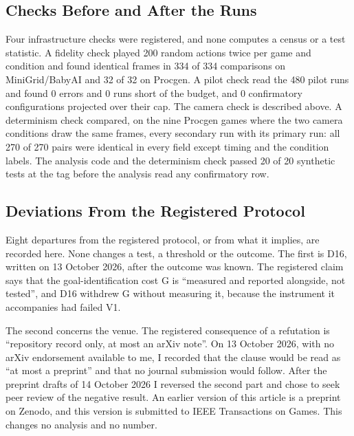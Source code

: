\documentclass[journal]{IEEEtran}
\begin{document}
\subsection{Checks Before and After the
Runs}\label{checks-before-and-after-the-runs}

Four infrastructure checks were registered, and none computes a census
or a test statistic. A fidelity check played 200 random actions twice
per game and condition and found identical frames in 334 of 334
comparisons on MiniGrid/BabyAI and 32 of 32 on Procgen. A pilot check
read the 480 pilot runs and found 0 errors and 0 runs short of the
budget, and 0 confirmatory configurations projected over their cap. The
camera check is described above. A determinism check compared, on the
nine Procgen games where the two camera conditions draw the same frames,
every secondary run with its primary run: all 270 of 270 pairs were
identical in every field except timing and the condition labels. The
analysis code and the determinism check passed 20 of 20 synthetic tests
at the tag before the analysis read any confirmatory row.

\subsection{Deviations From the Registered
Protocol}\label{deviations-from-the-registered-protocol}

Eight departures from the registered protocol, or from what it implies,
are recorded here. None changes a test, a threshold or the outcome. The
first is D16, written on 13 October 2026, after the outcome was known.
The registered claim says that the goal-identification cost G is
``measured and reported alongside, not tested'', and D16 withdrew G
without measuring it, because the instrument it accompanies had failed
V1.

The second concerns the venue. The registered consequence of a
refutation is ``repository record only, at most an arXiv note''. On 13
October 2026, with no arXiv endorsement available to me, I recorded that
the clause would be read as ``at most a preprint'' and that no journal
submission would follow. After the preprint drafts of 14 October 2026 I
reversed the second part and chose to seek peer review of the negative
result. An earlier version of this article is a preprint on Zenodo, and
this version is submitted to IEEE Transactions on Games. This changes no
analysis and no number.
\end{document}
